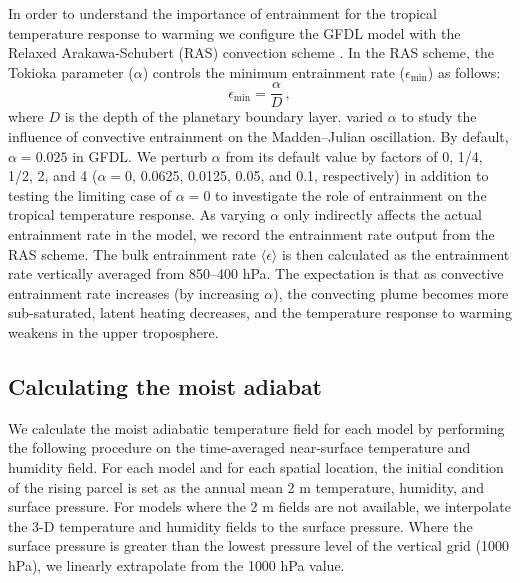 \documentclass{ametsocV5}
\begin{document}
In order to understand the importance of entrainment for the tropical temperature response to warming we configure the GFDL model with the Relaxed Arakawa-Schubert (RAS) convection scheme \citep{moorthi-suarez-1992}. In the RAS scheme, the Tokioka parameter ($\alpha$) controls the minimum entrainment rate ($\epsilon_\mathrm{min}$) as follows:
\begin{equation}
\epsilon_{\mathrm{min}} = \frac{\alpha}{D} \, ,
\end{equation}
where $D$ is the depth of the planetary boundary layer. \citet{tokioka-et-al-1988} varied $\alpha$ to study the influence of convective entrainment on the Madden--Julian oscillation. By default, $\alpha=0.025$ in GFDL. We perturb $\alpha$ from its default value by factors of 0, 1/4, 1/2, 2, and 4 ($\alpha=0$, 0.0625, 0.0125, 0.05, and 0.1, respectively) in addition to testing the limiting case of $\alpha=0$ to investigate the role of entrainment on the tropical temperature response. As varying $\alpha$ only indirectly affects the actual entrainment rate in the model, we record the entrainment rate output from the RAS scheme. The bulk entrainment rate $\langle\epsilon\rangle$ is then calculated as the entrainment rate vertically averaged from 850--400 hPa. The expectation is that as convective entrainment rate increases (by increasing $\alpha$), the convecting plume becomes more sub-saturated, latent heating decreases, and the temperature response to warming weakens in the upper troposphere.

\subsection{Calculating the moist adiabat}
We calculate the moist adiabatic temperature field for each model by performing the following procedure on the time-averaged near-surface temperature and humidity field. For each model and for each spatial location, the initial condition of the rising parcel is set as the annual mean 2 m temperature, humidity, and surface pressure. For models where the 2 m fields are not available, we interpolate the 3-D temperature and humidity fields to the surface pressure. Where the surface pressure is greater than the lowest pressure level of the vertical grid (1000 hPa), we linearly extrapolate from the 1000 hPa value.
\end{document}
